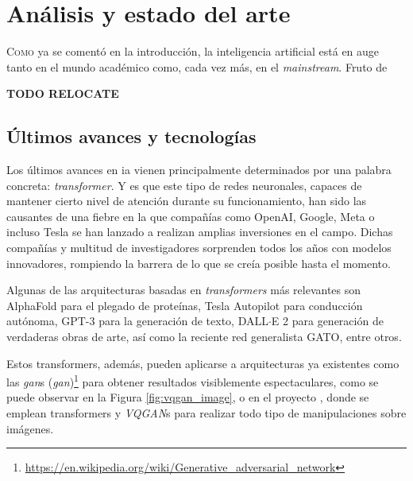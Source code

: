\chapter{Análisis y estado del arte}
\label{chap:analisis_estado_arte}

\lettrine{C}{omo} ya se comentó en la introducción, la inteligencia artificial está en auge tanto en el mundo académico como, cada vez más, en el \textit{mainstream}. Fruto de 

\textbf{TODO RELOCATE}

\section{Últimos avances y tecnologías}
\label{sec:ultimos_avances_tecnologias}
Los últimos avances en \acrshort{ia} vienen principalmente determinados por una palabra concreta: \textit{transformer}. Y es que este tipo de redes neuronales, capaces de mantener cierto nivel de atención \cite{vaswani2017attention_all_you_need} durante su funcionamiento, han sido las causantes de una fiebre en la que compañías como OpenAI, Google, Meta o incluso Tesla se han lanzado a realizan amplias inversiones en el campo. Dichas compañías y multitud de investigadores sorprenden todos los años con modelos innovadores, rompiendo la barrera de lo que se creía posible hasta el momento.

Algunas de las arquitecturas basadas en \textit{transformers} más relevantes son AlphaFold para el plegado de proteínas, Tesla Autopilot para conducción autónoma, GPT-3 para la generación de texto, DALL$\cdot$E 2 para generación de verdaderas obras de arte, así como la reciente red generalista GATO, entre otros.

Estos transformers, además, pueden aplicarse a arquitecturas ya existentes como las \textit{\acrshort{gan}}s (\textit{\acrlong{gan}})\footnote{\url{https://en.wikipedia.org/wiki/Generative\_adversarial\_network}} para obtener resultados visiblemente espectaculares, como se puede observar en la Figura \ref{fig:vqgan_image}, o en el proyecto \cite{chang2022maskgit}, donde se emplean transformers y \textit{VQGAN}s para realizar todo tipo de manipulaciones sobre imágenes.

